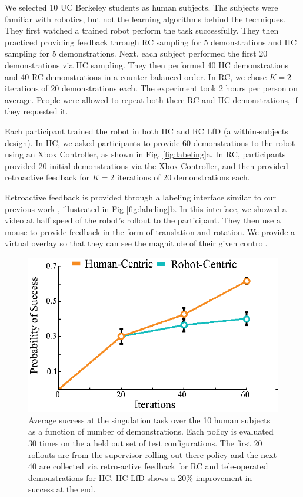 \documentclass[10pt, conference]{ieeeconf}      %
\begin{document}
We selected 10 UC Berkeley students as human subjects. The subjects were familiar with robotics, but not the learning algorithms behind the techniques. They first watched a trained robot perform the task successfully.  They then practiced providing feedback through RC sampling for 5 demonstrations and HC sampling for 5 demonstrations. Next, each subject performed the first 20 demonstrations via HC sampling. They then performed 40 HC demonstrations and 40 RC demonstrations in a counter-balanced order. In RC, we chose $K=2$ iterations of 20 demonstrations each. The experiment took 2 hours per person on average. People were allowed to repeat both there RC and HC demonstrations, if they requested it. 

Each participant trained the robot in both HC and RC LfD (a within-subjects design). In HC, we asked participants to provide 60 demonstrations to the robot using an Xbox Controller, as shown in Fig. \ref{fig:labeling}a. In RC, participants provided 20 initial demonstrations via the Xbox Controller, and then provided retroactive feedback for $K=2$ iterations of 20 demonstrations each.

Retroactive feedback is provided through a labeling interface similar to our previous work \cite{laskeyrobot}, illustrated in Fig \ref{fig:labeling}b. In this interface, we showed a video at half speed of the robot's rollout to the participant. They then use a mouse to provide feedback in the form of translation and rotation. We provide a virtual overlay so that they can see the magnitude of their given control. 



\begin{figure}
\centering
\includegraphics{f_figs/izzy_reward.eps}
\caption{
    \footnotesize
Average success at the singulation task over the 10 human subjects as a function of number of demonstrations. Each policy is evaluated 30 times on the a held out set of test configurations. The first 20 rollouts are from the supervisor rolling out there policy and the next 40 are collected via retro-active feedback for RC and tele-operated demonstrations for HC. HC LfD shows a 20$\%$ improvement in success at the end. }
\vspace*{-20pt}

\label{fig:izzy_rw}
\end{figure}
\end{document}
